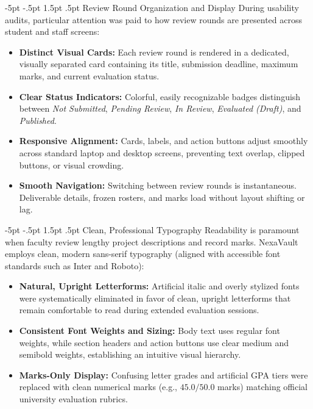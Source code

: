 \documentclass[11pt,a4paper]{article}
\makeatletter
\renewcommand\subsection{\@startsection{subsection}{2}{\z@}%
  {-5pt \@plus -1pt \@minus -.5pt}%
  {1.5pt \@plus .5pt}%
  {\normalfont\normalsize\bfseries\color{nexaSlate}}}
\makeatother
\begin{document}
\subsection{Review Round Organization and Display}
During usability audits, particular attention was paid to how review rounds are presented across student and staff screens:
\begin{itemize}
  \item \textbf{Distinct Visual Cards:} Each review round is rendered in a dedicated, visually separated card containing its title, submission deadline, maximum marks, and current evaluation status.
  \item \textbf{Clear Status Indicators:} Colorful, easily recognizable badges distinguish between \textit{Not Submitted}, \textit{Pending Review}, \textit{In Review}, \textit{Evaluated (Draft)}, and \textit{Published}.
  \item \textbf{Responsive Alignment:} Cards, labels, and action buttons adjust smoothly across standard laptop and desktop screens, preventing text overlap, clipped buttons, or visual crowding.
  \item \textbf{Smooth Navigation:} Switching between review rounds is instantaneous. Deliverable details, frozen rosters, and marks load without layout shifting or lag.
\end{itemize}

\subsection{Clean, Professional Typography}
Readability is paramount when faculty review lengthy project descriptions and record marks. NexaVault employs clean, modern sans-serif typography (aligned with accessible font standards such as Inter and Roboto):
\begin{itemize}
  \item \textbf{Natural, Upright Letterforms:} Artificial italic and overly stylized fonts were systematically eliminated in favor of clean, upright letterforms that remain comfortable to read during extended evaluation sessions.
  \item \textbf{Consistent Font Weights and Sizing:} Body text uses regular font weights, while section headers and action buttons use clear medium and semibold weights, establishing an intuitive visual hierarchy.
  \item \textbf{Marks-Only Display:} Confusing letter grades and artificial GPA tiers were replaced with clean numerical marks (e.g., $45.0 / 50.0$ marks) matching official university evaluation rubrics.
\end{itemize}
\end{document}
